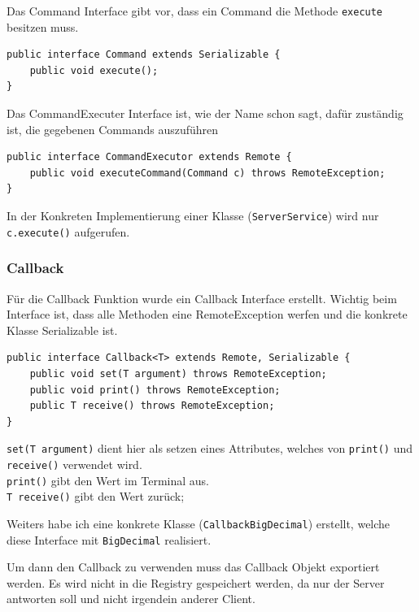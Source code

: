 Das Command Interface gibt vor, dass ein Command die Methode \texttt{execute} besitzen muss.

\begin{lstlisting}[style=Java, caption=Command Interface]
public interface Command extends Serializable {
  	public void execute();
}
\end{lstlisting}

Das CommandExecuter Interface ist, wie der Name schon sagt, daf\"ur zust\"andig ist, die gegebenen Commands auszuf\"uhren

\begin{lstlisting}[style=Java, caption=CommandExecuter Interface]
public interface CommandExecutor extends Remote {
    public void executeCommand(Command c) throws RemoteException;
}
\end{lstlisting}

In der Konkreten Implementierung einer Klasse (\texttt{ServerService}) wird nur \texttt{c.execute()} aufgerufen.

\subsubsection{Callback}

F\"ur die Callback Funktion wurde ein Callback Interface erstellt.
Wichtig beim Interface ist, dass alle Methoden eine RemoteException werfen und die konkrete Klasse Serializable ist.

\begin{lstlisting}[style=Java, caption=Callback Interface]
public interface Callback<T> extends Remote, Serializable {
    public void set(T argument) throws RemoteException;
    public void print() throws RemoteException;
    public T receive() throws RemoteException;
}
\end{lstlisting}

\texttt{set(T argument)} dient hier als setzen eines Attributes, welches von \texttt{print()} und \texttt{receive()} verwendet wird. \\
\texttt{print()} gibt den Wert im Terminal aus.\\
\texttt{T receive()} gibt den Wert zur\"uck;

Weiters habe ich eine konkrete Klasse (\texttt{CallbackBigDecimal}) erstellt, welche diese Interface mit \texttt{BigDecimal} realisiert.

Um dann den Callback zu verwenden muss das Callback Objekt exportiert werden.
Es wird nicht in die Registry gespeichert werden, da nur der Server antworten soll und nicht irgendein anderer Client.

